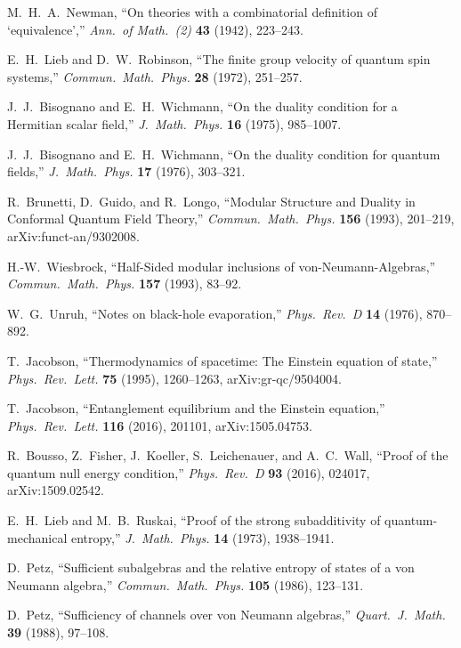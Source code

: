 M.~H.~A.~Newman,
``On theories with a combinatorial definition of `equivalence',''
\emph{Ann.\ of Math.\ (2)} \textbf{43} (1942), 223--243.

E.~H.~Lieb and D.~W.~Robinson,
``The finite group velocity of quantum spin systems,''
\emph{Commun.\ Math.\ Phys.} \textbf{28} (1972), 251--257.

J.~J.~Bisognano and E.~H.~Wichmann,
``On the duality condition for a Hermitian scalar field,''
\emph{J.\ Math.\ Phys.} \textbf{16} (1975), 985--1007.

J.~J.~Bisognano and E.~H.~Wichmann,
``On the duality condition for quantum fields,''
\emph{J.\ Math.\ Phys.} \textbf{17} (1976), 303--321.

R.~Brunetti, D.~Guido, and R.~Longo,
``Modular Structure and Duality in Conformal Quantum Field Theory,''
\emph{Commun.\ Math.\ Phys.} \textbf{156} (1993), 201--219,
arXiv:funct-an/9302008.

H.-W.~Wiesbrock,
``Half-Sided modular inclusions of von-Neumann-Algebras,''
\emph{Commun.\ Math.\ Phys.} \textbf{157} (1993), 83--92.

W.~G.~Unruh,
``Notes on black-hole evaporation,''
\emph{Phys.\ Rev.\ D} \textbf{14} (1976), 870--892.

T.~Jacobson,
``Thermodynamics of spacetime: The Einstein equation of state,''
\emph{Phys.\ Rev.\ Lett.} \textbf{75} (1995), 1260--1263,
arXiv:gr-qc/9504004.

T.~Jacobson,
``Entanglement equilibrium and the Einstein equation,''
\emph{Phys.\ Rev.\ Lett.} \textbf{116} (2016), 201101,
arXiv:1505.04753.

R.~Bousso, Z.~Fisher, J.~Koeller, S.~Leichenauer, and A.~C.~Wall,
``Proof of the quantum null energy condition,''
\emph{Phys.\ Rev.\ D} \textbf{93} (2016), 024017,
arXiv:1509.02542.

E.~H.~Lieb and M.~B.~Ruskai,
``Proof of the strong subadditivity of quantum-mechanical entropy,''
\emph{J.\ Math.\ Phys.} \textbf{14} (1973), 1938--1941.

D.~Petz,
``Sufficient subalgebras and the relative entropy of states of a von Neumann algebra,''
\emph{Commun.\ Math.\ Phys.} \textbf{105} (1986), 123--131.

D.~Petz,
``Sufficiency of channels over von Neumann algebras,''
\emph{Quart.\ J.\ Math.} \textbf{39} (1988), 97--108.

